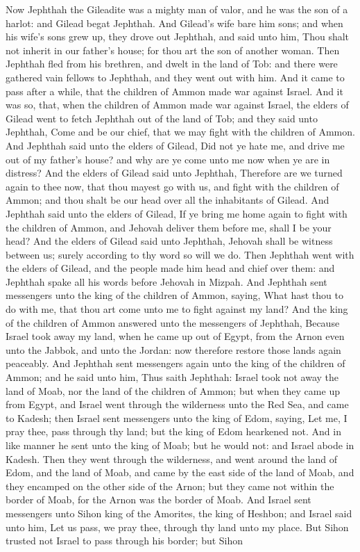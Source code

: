 Now Jephthah the Gileadite was a mighty man of valor, and he was the son of a harlot: and Gilead begat Jephthah. And Gilead’s wife bare him sons; and when his wife’s sons grew up, they drove out Jephthah, and said unto him, Thou shalt not inherit in our father’s house; for thou art the son of another woman. Then Jephthah fled from his brethren, and dwelt in the land of Tob: and there were gathered vain fellows to Jephthah, and they went out with him.  And it came to pass after a while, that the children of Ammon made war against Israel. And it was so, that, when the children of Ammon made war against Israel, the elders of Gilead went to fetch Jephthah out of the land of Tob; and they said unto Jephthah, Come and be our chief, that we may fight with the children of Ammon. And Jephthah said unto the elders of Gilead, Did not ye hate me, and drive me out of my father’s house? and why are ye come unto me now when ye are in distress? And the elders of Gilead said unto Jephthah, Therefore are we turned again to thee now, that thou mayest go with us, and fight with the children of Ammon; and thou shalt be our head over all the inhabitants of Gilead. And Jephthah said unto the elders of Gilead, If ye bring me home again to fight with the children of Ammon, and Jehovah deliver them before me, shall I be your head? And the elders of Gilead said unto Jephthah, Jehovah shall be witness between us; surely according to thy word so will we do. Then Jephthah went with the elders of Gilead, and the people made him head and chief over them: and Jephthah spake all his words before Jehovah in Mizpah.  And Jephthah sent messengers unto the king of the children of Ammon, saying, What hast thou to do with me, that thou art come unto me to fight against my land? And the king of the children of Ammon answered unto the messengers of Jephthah, Because Israel took away my land, when he came up out of Egypt, from the Arnon even unto the Jabbok, and unto the Jordan: now therefore restore those lands again peaceably. And Jephthah sent messengers again unto the king of the children of Ammon; and he said unto him, Thus saith Jephthah: Israel took not away the land of Moab, nor the land of the children of Ammon; but when they came up from Egypt, and Israel went through the wilderness unto the Red Sea, and came to Kadesh; then Israel sent messengers unto the king of Edom, saying, Let me, I pray thee, pass through thy land; but the king of Edom hearkened not. And in like manner he sent unto the king of Moab; but he would not: and Israel abode in Kadesh. Then they went through the wilderness, and went around the land of Edom, and the land of Moab, and came by the east side of the land of Moab, and they encamped on the other side of the Arnon; but they came not within the border of Moab, for the Arnon was the border of Moab. And Israel sent messengers unto Sihon king of the Amorites, the king of Heshbon; and Israel said unto him, Let us pass, we pray thee, through thy land unto my place. But Sihon trusted not Israel to pass through his border; but Sihon 